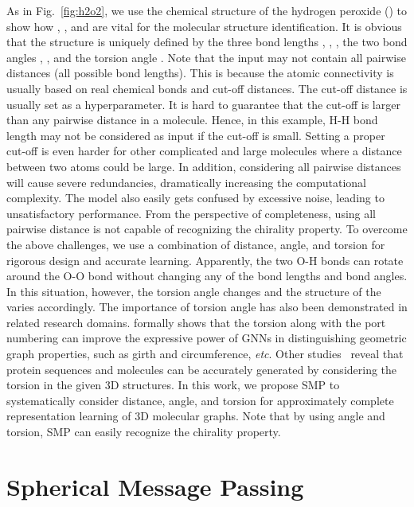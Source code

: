 \documentclass{article}
\begin{document}
As in Fig.~\ref{fig:h2o2}, we use the chemical structure of the hydrogen peroxide () to show how , , and  are vital
for the molecular structure identification.
It is obvious that the structure is uniquely defined by the three bond lengths 
, , ,
the two bond angles , ,
and the torsion angle .
Note that the input may not contain all pairwise distances (all possible bond lengths).
This is because the atomic connectivity is usually based on
real chemical bonds and cut-off distances.
\textcolor{COLOR}{The cut-off distance is usually set as a hyperparameter.
It is hard to guarantee that the cut-off is larger than any pairwise distance in a molecule.
Hence, in this example, H-H bond length may not be considered as input
if the cut-off is small.
Setting a proper cut-off is even harder for other complicated and large molecules
where a distance between two atoms could be large.
In addition, considering all pairwise distances will cause severe redundancies,
dramatically increasing the computational complexity.
The model also easily gets confused by excessive noise,
leading to unsatisfactory performance.
From the perspective of completeness,
using all pairwise distance is not capable of recognizing
the chirality property.
To overcome the above challenges, we use a combination of distance, angle, and torsion
for rigorous design and accurate learning.}
Apparently, the two O-H bonds can rotate around the O-O bond
without changing any of the bond lengths and bond angles.
In this situation, however,
the torsion angle  changes and the structure of the 
varies accordingly.
The importance of
torsion angle has also been demonstrated in related research domains.
\cite{garg2020generalization} formally shows that
the torsion along with the port numbering can improve
the expressive power of GNNs in distinguishing geometric graph properties, such as
girth and circumference, \emph{etc}.
Other studies~\citep{ingraham2019generative,simm2020reinforcement}
reveal that protein sequences and molecules can be accurately generated by
considering the torsion in the given 3D structures.
In this work, we propose SMP to systematically consider distance, angle,
and torsion
for approximately complete representation learning of 3D molecular graphs.
\textcolor{COLOR}{Note that by using angle and torsion, SMP can easily 
recognize the chirality property.
}

\section{Spherical Message Passing} \label{sec:smp}
\end{document}
